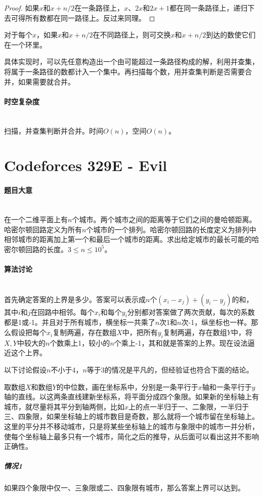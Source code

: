 \documentclass[UTF8]{ctexart}
\newcommand{\myparagraph}[1]{\paragraph{#1}\mbox{}\\}
\theoremstyle{nonumberplain}
\newtheorem{proof}{\hspace{1em}证明：}
\begin{document}
			\begin{proof} 如果$x$和$x+n/2$在一条路径上，$x$、$2x$和$2x+1$都在同一条路径上，递归下去可得所有数都在同一路径上。反过来同理。 \end{proof}
			
			对于每个$x$，如果$x$和$x+n/2$在不同路径上，则可交换$x$和$x+n/2$到达的数使它们在一个环里。
			
			具体实现时，可以先任意构造出一个由可能超过一条路径构成的解，利用并查集，将属于一条路径的数都计入一个集中。再扫描每个数，用并查集判断是否需要合并，如果需要就合并。
		
		\myparagraph{时空复杂度}
		
			扫描，并查集判断并合并。时间$O(n)$，空间$O(n)$。
	
	\section{Codeforces 329E - Evil}
	
		\myparagraph{题目大意}
		
			在一个二维平面上有$n$个城市。两个城市之间的距离等于它们之间的曼哈顿距离。哈密尔顿回路定义为所有$n$个城市的一个排列。哈密尔顿回路的长度定义为排列中相邻城市的距离加上第一个和最后一个城市的距离。求出给定城市的最长可能的哈密尔顿回路的长度。$3 \leq n \leq 10^5$。
			
		\myparagraph{算法讨论}
		
			首先确定答案的上界是多少。答案可以表示成$n$个$(x_i-x_j)+(y_i-y_j)$的和，其中$i$和$j$在回路中相邻。每个$x_i$和每个$y_i$分别都对答案做了两次贡献，每次的系数都是1或-1。并且对于所有城市，横坐标一共乘了$n$次1和$n$次-1，纵坐标也一样。那么假设把每个$x_i$复制两遍，存在数组$X$中，把所有$y_i$复制两遍，存在数组$Y$中，将$X,Y$中较大的$n$个数乘上1，较小的$n$个乘上-1，其和就是答案的上界。现在设法逼近这个上界。
			
			以下讨论假设$n$不小于4，$n$等于3的情况是平凡的，但经验证也符合下面的结论。
			
			取数组$X$和数组$Y$的中位数，画在坐标系中，分别是一条平行于$x$轴和一条平行于$y$轴的直线。以这两条直线建新坐标系，将平面分成四个象限。如果新的坐标轴上有城市，就尽量将其平分到轴两侧，比如$x$上的点一半归于一、二象限，一半归于三、四象限，如果坐标轴上的城市数目是奇数，那么就将一个城市留在坐标轴上。这里的平分并不移动城市，只是将某些坐标轴上的城市与象限中的城市一并分析，使每个坐标轴上最多只有一个城市，简化之后的推导，从后面可以看出这并不影响正确性。
			
			\subparagraph{情况1}
			如果四个象限中仅一、三象限或二、四象限有城市，那么答案上界可以达到。
			
\end{document}
